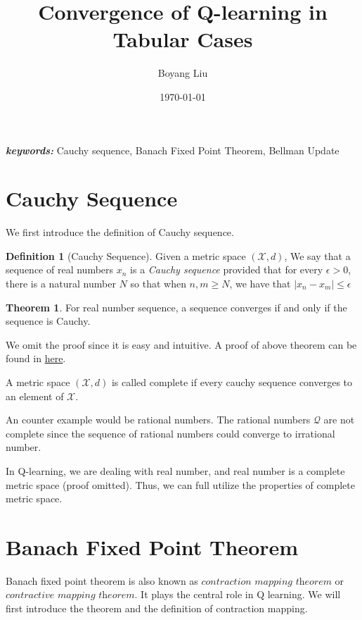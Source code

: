 \documentclass[a4paper]{article}
\title{Convergence of Q-learning in Tabular Cases}
\author{Boyang Liu}
\date{\today}
\theoremstyle{definition}
\newtheorem{defn}{Definition}[section]
\newtheorem{theo}{Theorem}[section]
\providecommand{\keywords}[1]{\textbf{\textit{keywords: }} #1}
\begin{document}
\maketitle


\keywords{Cauchy sequence, Banach Fixed Point Theorem, Bellman Update}

\section{Cauchy Sequence}
We first introduce the definition of Cauchy sequence.

\begin{defn}[Cauchy Sequence]
Given a metric space $(\mathcal{X}, d)$, We say that a sequence of real numbers ${x_n}$ is a \textit{Cauchy sequence} provided
that for every $\epsilon > 0$, there is a natural number $N$ so that when $n, m \geq N$, we have that $|x_n - x_m|\leq \epsilon$
\end{defn}

\begin{theo}
For real number sequence, a sequence converges if and only if the sequence is Cauchy.
\end{theo}

We omit the proof since it is easy and intuitive. A proof of above theorem can be found in \href{http://math.caltech.edu/~nets/lecture4.pdf}{here}.

A metric space $(\mathcal{X}, d)$ is called complete if every cauchy sequence converges to an element of $\mathcal{X}$.

An counter example would be rational numbers. The rational numbers $\mathcal{Q}$ are not complete since the sequence of rational numbers could converge to irrational number.

In Q-learning, we are dealing with real number, and real number is a complete metric space (proof omitted). Thus, we can full utilize the properties of complete metric space.
\section{Banach Fixed Point Theorem}
Banach fixed point theorem is also known as $\textit{contraction mapping theorem}$ or $\textit{contractive mapping theorem}$. It plays the central role in Q learning. We will first introduce the theorem and the definition of contraction mapping.
\end{document}
